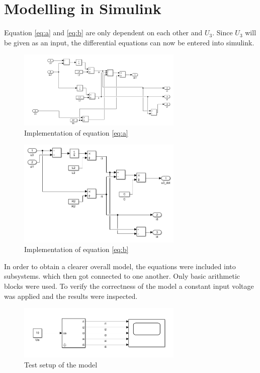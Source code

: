 \section{Modelling in Simulink}
Equation \ref{eq:a} and \ref{eq:b} are only dependent on each other and $U_3$. Since $U_3$ will be given as an input, the differential equations can now be entered into simulink.
	\begin{figure}[H]
		\centering
		\includegraphics[width=0.7\textwidth]{figures/equation1.png}
		\caption{Implementation of equation \ref{eq:a}}
		\label{fig:equation1}
	\end{figure}
	\begin{figure}[H]
		\centering
		\includegraphics[width=0.7\textwidth]{figures/equation2.png}
		\caption{Implementation of equation \ref{eq:b}}
		\label{fig:equation2}
	\end{figure}
In order to obtain a clearer overall model, the equations were included into subsystems. which then got connected to one another. Only basic arithmetic blocks were used. To verify the correctness of the model a constant input voltage was applied and the results were inspected. 
	\begin{figure}[H]
		\centering
		\includegraphics[width=0.7\textwidth]{figures/testsetup.png}
		\caption{Test setup of the model}
		\label{fig:testsetup}
	\end{figure}
